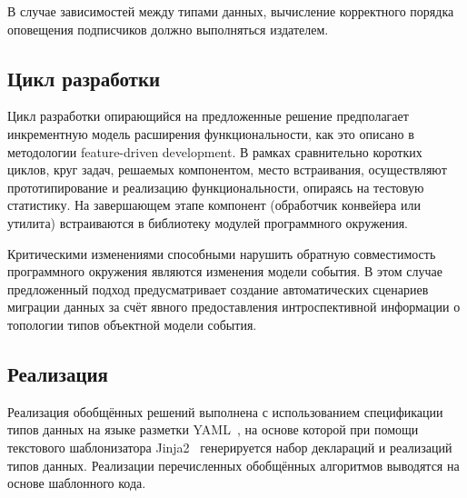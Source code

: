 В случае зависимостей между типами данных, вычисление корректного порядка
оповещения подписчиков должно выполняться издателем.

\subsection{Цикл разработки}

Цикл разработки опирающийся на предложенные решение предполагает
инкрементную модель расширения функциональности, как это описано
в методологии feature-driven development. В рамках сравнительно
коротких циклов, круг задач, решаемых компонентом, место встраивания,
осуществляют прототипирование и реализацию функциональности, опираясь
на тестовую статистику. На завершающем этапе компонент (обработчик
конвейера или утилита) встраиваются в библиотеку модулей программного
окружения.

Критическими изменениями способными нарушить обратную совместимость
программного окружения являются изменения модели события. В этом случае
предложенный подход предусматривает создание автоматических сценариев
миграции данных за счёт явного предоставления интроспективной информации о
топологии типов объектной модели события.

\subsection{Реализация}

Реализация обобщённых решений выполнена с использованием
спецификации типов данных на языке разметки YAML~\cite{yaml-rfc9512},
на основе которой при помощи текстового шаблонизатора
Jinja2~\cite{jinja2-docs} генерируется набор
деклараций и реализаций типов данных. Реализации перечисленных
обобщённых алгоритмов выводятся на основе шаблонного кода.

